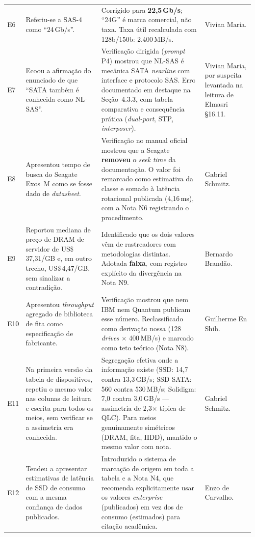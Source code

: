 \documentclass[11pt,a4paper]{article}
\begin{document}
\begin{center}
\begin{longtable}{@{}p{0.5cm}>{\RaggedRight\arraybackslash}p{4.4cm}>{\RaggedRight\arraybackslash}p{5.2cm}>{\RaggedRight\arraybackslash}p{4.4cm}@{}}
E6 & Referiu-se a SAS-4 como ``24\,Gb/s''. &
Corrigido para \textbf{22,5\,Gb/s}; ``24G'' é marca comercial, não taxa. Taxa útil
recalculada com 128b/150b: 2.400\,MB/s. & Vivian Maria. \\

E7 & Ecoou a afirmação do enunciado de que ``SATA também é conhecida como NL-SAS''. &
Verificação dirigida (\emph{prompt} P4) mostrou que NL-SAS é mecânica SATA \emph{nearline}
com interface e protocolo SAS. Erro documentado em destaque na Seção~4.3.3, com tabela
comparativa e consequência prática (\emph{dual-port}, STP, \emph{interposer}). &
Vivian Maria, por suspeita levantada na leitura de Elmasri §16.11. \\

E8 & Apresentou tempo de busca do Seagate Exos~M como se fosse dado de \emph{datasheet}. &
Verificação no manual oficial mostrou que a Seagate \textbf{removeu} o \emph{seek time} da
documentação. O valor foi remarcado como estimativa da classe e somado à latência
rotacional publicada (4,16\,ms), com a Nota N6 registrando o procedimento. &
Gabriel Schmitz. \\

E9 & Reportou mediana de preço de DRAM de servidor de US\$\,37,31/GB e, em outro trecho,
US\$\,4,47/GB, sem sinalizar a contradição. &
Identificado que os dois valores vêm de rastreadores com metodologias distintas. Adotada
\textbf{faixa}, com registro explícito da divergência na Nota N9. & Bernardo Brandão. \\

E10 & Apresentou \emph{throughput} agregado de biblioteca de fita como especificação de
fabricante. &
Verificação mostrou que nem IBM nem Quantum publicam esse número. Reclassificado como
derivação nossa (128 \emph{drives} $\times$ 400\,MB/s) e marcado como teto teórico
(Nota N8). & Guilherme En Shih. \\

E11 & Na primeira versão da tabela de dispositivos, repetiu o mesmo valor nas colunas de
leitura e escrita para todos os meios, sem verificar se a assimetria era conhecida. &
Segregação efetiva onde a informação existe (SSD: 14,7 contra 13,3\,GB/s; SSD SATA: 560
contra 530\,MB/s; Solidigm: 7,0 contra 3,0\,GB/s --- assimetria de 2,3$\times$ típica de
QLC). Para meios genuinamente simétricos (DRAM, fita, HDD), mantido o mesmo valor com nota.
& Gabriel Schmitz. \\

E12 & Tendeu a apresentar estimativas de latência de SSD de consumo com a mesma confiança
de dados publicados. &
Introduzido o sistema de marcação de origem em toda a tabela e a Nota N4, que recomenda
explicitamente usar os valores \emph{enterprise} (publicados) em vez dos de consumo
(estimados) para citação acadêmica. & Enzo de Carvalho. \\


\end{longtable}
\end{center}
\end{document}
